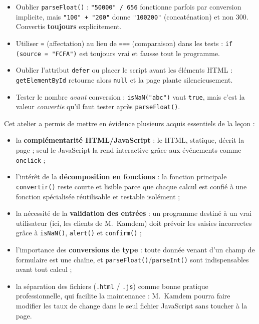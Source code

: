 \documentclass[11pt]{article}
\newcounter{popsec}
\newcounter{popsub}
\newcommand{\courssub}[1]{%
  \stepcounter{popsub}%
  \par\vspace{9pt}\noindent{\popxbold\fontsize{11.5}{13}\selectfont\color{popink}{\color{poporange}\thepopsec.\thepopsub}\hspace{6pt}#1}\par\nopagebreak\vspace{4pt}
}
\begin{document}
\begin{attention}
\begin{itemize}
\item Oublier \texttt{parseFloat()} : \texttt{"50000" / 656} fonctionne parfois par conversion implicite, mais \texttt{"100" + "200"} donne \texttt{"100200"} (concaténation) et non $300$. Convertis \textbf{toujours} explicitement.
\item Utiliser \texttt{=} (affectation) au lieu de \texttt{===} (comparaison) dans les tests : \texttt{if (source = "FCFA")} est toujours vrai et fausse tout le programme.
\item Oublier l'attribut \texttt{defer} ou placer le script avant les éléments HTML : \texttt{getElementById} retourne alors \texttt{null} et la page plante silencieusement.
\item Tester le nombre \emph{avant} conversion : \texttt{isNaN("abc")} vaut \texttt{true}, mais c'est la valeur \emph{convertie} qu'il faut tester après \texttt{parseFloat()}.
\end{itemize}
\end{attention}

\courssub{Bilan de l'activité}

Cet atelier a permis de mettre en évidence plusieurs acquis essentiels de la leçon :

\begin{itemize}
\item la \textbf{complémentarité HTML/JavaScript} : le HTML, statique, décrit la page ; seul le JavaScript la rend interactive grâce aux événements comme \texttt{onclick} ;
\item l'intérêt de la \textbf{décomposition en fonctions} : la fonction principale \texttt{convertir()} reste courte et lisible parce que chaque calcul est confié à une fonction spécialisée réutilisable et testable isolément ;
\item la nécessité de la \textbf{validation des entrées} : un programme destiné à un vrai utilisateur (ici, les clients de M.~Kamdem) doit prévoir les saisies incorrectes grâce à \texttt{isNaN()}, \texttt{alert()} et \texttt{confirm()} ;
\item l'importance des \textbf{conversions de type} : toute donnée venant d'un champ de formulaire est une chaîne, et \texttt{parseFloat()}/\texttt{parseInt()} sont indispensables avant tout calcul ;
\item la séparation des fichiers (\texttt{.html} / \texttt{.js}) comme bonne pratique professionnelle, qui facilite la maintenance : M.~Kamdem pourra faire modifier les taux de change dans le seul fichier JavaScript sans toucher à la page.
\end{itemize}
\end{document}
